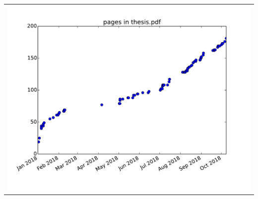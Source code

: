 \documentclass[12pt]{cmuthesis}
\begin{document}
\newpage
\thispagestyle{empty}
\begin{center}
\begin{tabular}{c}
\vspace{12em} \\
\includegraphics[width=\textwidth]{pages.pdf}
\end{tabular}
\end{center}

%

\backmatter


\renewcommand{\bibsection}{\chapter{\bibname}
\inspirationalquote{Only a doctor of philosophy, Darth.}{Robert Marsh}
}

\end{document}
